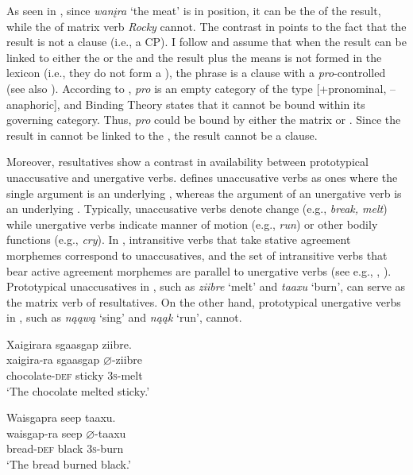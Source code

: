 \documentclass[output=paper]{LSP/langsci}
\begin{document}
As seen in , since \textit{wanįra} `the meat' is in  position, it can be the  of the result, while the  of matrix verb \textit{Rocky} cannot. The contrast in  points to the fact that the result is not a clause (i.e., a CP). I follow \citet{Li1999} and assume that when the result can be linked to either the  or the  and the result plus the means  is not formed in the lexicon (i.e., they do not form a ), the  phrase is a clause with a \textit{pro}-controlled  (see also \citealt{Song2005}). According to \citet{Chomsky1982}, \textit{pro} is an empty category of the type [+pronominal, --anaphoric], and Binding Theory states that it cannot be bound within its governing category. Thus, \textit{pro} could be bound by either the matrix  or . Since the result in  cannot be linked to the , the result cannot be a clause.

Moreover,  resultatives show a contrast in availability between prototypical unaccusative and unergative verbs. \citet{Perlmutter1978} defines unaccusative verbs as ones where the single argument is an underlying , whereas the argument of an unergative verb is an underlying . Typically, unaccusative verbs denote change (e.g., \textit{break, melt}) while unergative verbs indicate manner of motion (e.g., \textit{run}) or other bodily functions (e.g., \textit{cry}). In , intransitive verbs that take stative agreement morphemes correspond to unaccusatives, and the set of intransitive verbs that bear active agreement morphemes are parallel to unergative verbs (see e.g., \citealt{Williamson1984}, \citealt{Woolford2010}). Prototypical unaccusatives in , such as \textit{ziibre} `melt' and \textit{taaxu} `burn', can serve as the matrix verb of resultatives. On the other hand, prototypical unergative verbs in , such as \textit{nąąwą} `sing' and \textit{nąąk} `run', cannot.

\begin{exe}
\ex\label{ex:rosen:19}
\begin{xlist}

\ex \glll Xaigirara sgaasgap {ziibre}. \\
 xaigira-ra sgaasgap {$\varnothing$}-ziibre\\
chocolate-\textsc{def} sticky \textsc{3s}-melt\\
\glt `The chocolate melted sticky.'

\ex \glll Waisgapra seep {taaxu}.\\
 waisgap-ra seep {$\varnothing$}-taaxu\\
bread-\textsc{def} black \textsc{3s}-burn\\
\glt `The bread burned black.'

\end{xlist}
\end{exe}
\end{document}
